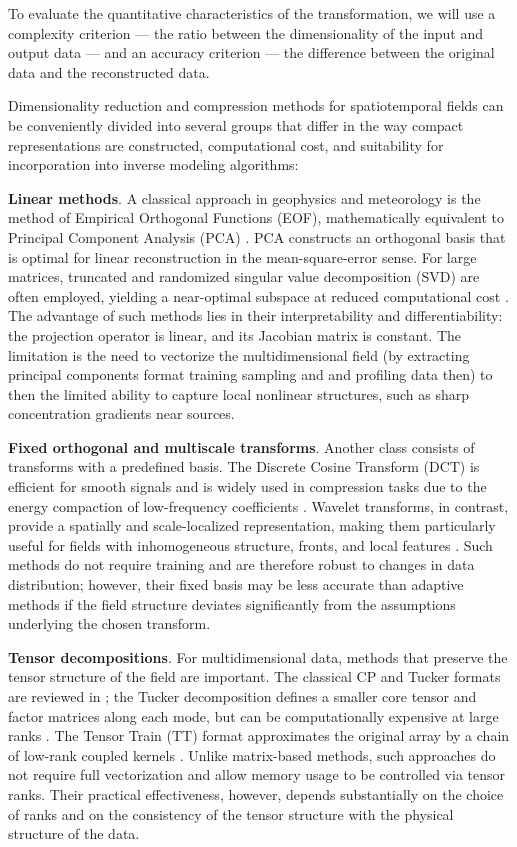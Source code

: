 \documentclass[pdflatex,sn-mathphys-num]{sn-jnl}%
\theoremstyle{thmstyleone}%
\theoremstyle{thmstyletwo}%
\theoremstyle{thmstylethree}%
\begin{document}
To evaluate the quantitative characteristics of the transformation, we will use a complexity criterion — the ratio between the dimensionality of the input and output data — and an accuracy criterion — the difference between the original data and the reconstructed data.

Dimensionality reduction and compression methods for spatiotemporal fields can be conveniently divided into several groups that differ in the way compact representations are constructed, computational cost, and suitability for incorporation into inverse modeling algorithms:

\textbf{Linear methods}. A classical approach in geophysics and meteorology is the method of Empirical Orthogonal Functions (EOF), mathematically equivalent to Principal Component Analysis (PCA) \cite{lorenz1956empirical,jolliffe2002principal}. PCA constructs an orthogonal basis that is optimal for linear reconstruction in the mean-square-error sense. For large matrices, truncated and randomized singular value decomposition (SVD) are often employed, yielding a near-optimal subspace at reduced computational cost \cite{Halko2011}. The advantage of such methods lies in their interpretability and differentiability: the projection operator is linear, and its Jacobian matrix is constant. The limitation is the need to vectorize the multidimensional field (by extracting principal components format training sampling and and profiling data then) to then the limited ability to capture local nonlinear structures, such as sharp concentration gradients near sources.

\textbf{Fixed orthogonal and multiscale transforms}. Another class consists of transforms with a predefined basis. The Discrete Cosine Transform (DCT) is efficient for smooth signals and is widely used in compression tasks due to the energy compaction of low-frequency coefficients \cite{ahmed1974discrete}. Wavelet transforms, in contrast, provide a spatially and scale-localized representation, making them particularly useful for fields with inhomogeneous structure, fronts, and local features \cite{Mallat1989,Daubechies1992}. Such methods do not require training and are therefore robust to changes in data distribution; however, their fixed basis may be less accurate than adaptive methods if the field structure deviates significantly from the assumptions underlying the chosen transform.



\textbf{Tensor decompositions}. For multidimensional data, methods that preserve the tensor structure of the field are important. The classical CP and Tucker formats are reviewed in \cite{Kolda2009}; the Tucker decomposition defines a smaller core tensor and factor matrices along each mode, but can be computationally expensive at large ranks \cite{Tucker1966}. The Tensor Train (TT) format approximates the original array by a chain of low-rank coupled kernels \cite{Oseledets2011}. Unlike matrix-based methods, such approaches do not require full vectorization and allow memory usage to be controlled via tensor ranks. Their practical effectiveness, however, depends substantially on the choice of ranks and on the consistency of the tensor structure with the physical structure of the data.
\end{document}
